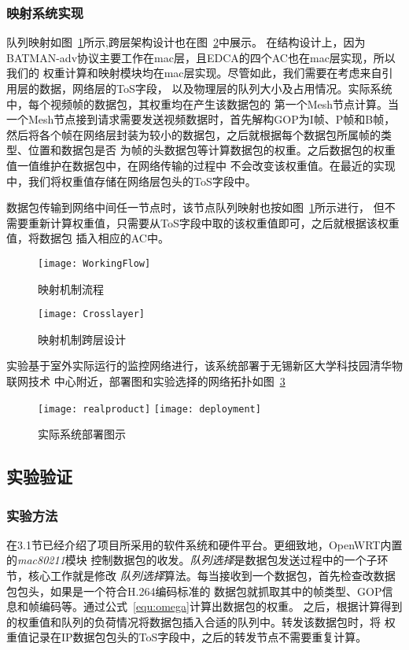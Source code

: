 \subsubsection{映射系统实现}
队列映射如图~\ref{fig:workingflow}所示,跨层架构设计也在图~\ref{fig:crosslayer}中展示。
在结构设计上，因为BATMAN-adv协议主要工作在mac层，且EDCA的四个AC也在mac层实现，所以我们的
权重计算和映射模块均在mac层实现。尽管如此，我们需要在考虑来自引用层的数据，网络层的ToS字段，
以及物理层的队列大小及占用情况。实际系统中，每个视频帧的数据包，其权重均在产生该数据包的
第一个Mesh节点计算。当一个Mesh节点接到请求需要发送视频数据时，首先解构GOP为I帧、P帧和B帧，
然后将各个帧在网络层封装为较小的数据包，之后就根据每个数据包所属帧的类型、位置和数据包是否
为帧的头数据包等计算数据包的权重。之后数据包的权重值一值维护在数据包中，在网络传输的过程中
不会改变该权重值。在最近的实现中，我们将权重值存储在网络层包头的ToS字段中。

数据包传输到网络中间任一节点时，该节点队列映射也按如图~\ref{fig:workingflow}所示进行，
但不需要重新计算权重值，只需要从ToS字段中取的该权重值即可，之后就根据该权重值，将数据包
插入相应的AC中。

\begin{figure}[H] %
  \centering
  \texttt{[image: WorkingFlow]}
  \caption{映射机制流程}
  \label{fig:workingflow}
\end{figure}
\begin{figure}[H] %
  \centering
  \texttt{[image: Crosslayer]}
  \caption{映射机制跨层设计}
  \label{fig:crosslayer}
\end{figure}

实验基于室外实际运行的监控网络进行，该系统部署于无锡新区大学科技园清华物联网技术
中心附近，部署图和实验选择的网络拓扑如图~\ref{fig:realdeploy}
\begin{figure}[h]
  \centering
  \subcaptionbox{}
      {\texttt{[image: realproduct]}}
  \hspace{1em}
  \subcaptionbox{}
    {\texttt{[image: deployment]}}
  \caption{实际系统部署图示}
  \label{fig:realdeploy}
\end{figure}


\subsection{实验验证}
\renewcommand{\thesubsubsection}{\Alph{subsubsection}.}
\subsubsection{实验方法}
在3.1节已经介绍了项目所采用的软件系统和硬件平台。更细致地，OpenWRT内置的\emph{mac80211}模块
控制数据包的收发。\emph{队列选择}是数据包发送过程中的一个子环节，核心工作就是修改\emph{
队列选择}算法。每当接收到一个数据包，首先检查改数据包包头，如果是一个符合H.264编码标准的
数据包就抓取其中的帧类型、GOP信息和帧编码等。通过公式~\ref{equ:omega}计算出数据包的权重。
之后，根据计算得到的权重值和队列的负荷情况将数据包插入合适的队列中。转发该数据包时，将
权重值记录在IP数据包包头的ToS字段中，之后的转发节点不需要重复计算。

